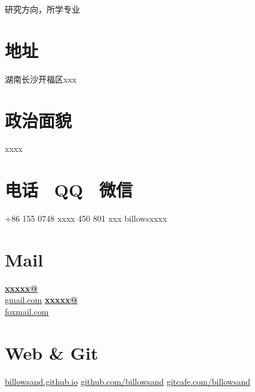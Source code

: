 \documentclass[]{friggeri-cv}
\begin{document}
      {研究方向，所学专业}
      

\begin{aside}
  \section{\cuti 地址}
    湖南长沙开福区xxx
  \section{\cuti 政治面貌}
    xxxx
  \section{\cuti 电话~ QQ~ 微信}
    +86 155 0748 xxxx
    450 801 xxx
    billowsxxxx
  \section{Mail}
    \href{mailto:billowsand@gmail.com}{\textbf{xxxxx@}\\gmail.com}
    \href{mailto:billowsand@foxmail.com}{\textbf{xxxxx@}\\foxmail.com}
  \section{Web \& Git}
    \href{http://www.carminebenedetto.net}{billowsand.github.io}
    \href{https://github.com/neoben}{github.com/billowsand}
    \href{https://bitbucket.org/neoben}{gitcafe.com/billowsand}

\end{aside}
\end{document}
